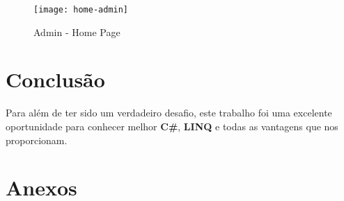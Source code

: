 \documentclass[11pt]{article}
\begin{document}
	\begin{figure}[!ht]
		\texttt{[image: home-admin]}
		\centering
		\caption{Admin - Home Page}
		\label{fig:admin-home-page}
	\end{figure}
	    
    \vfill
    \clearpage
    
    
	\large
	\section{Conclusão}
	\normalsize
	
	Para além de ter sido um verdadeiro desafio, este trabalho foi uma excelente oportunidade para conhecer melhor \textbf{C\#}, \textbf{LINQ} e todas as vantagens que nos proporcionam.
	
	
	\large
	\section{Anexos}
	\normalsize
	
	\listoffigures
\end{document}
